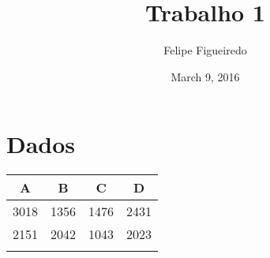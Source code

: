 \documentclass[]{article}
\title{Trabalho 1}
\author{Felipe Figueiredo}
\date{March 9, 2016}
\begin{document}
\maketitle


\section{Dados}\label{dados}

\begin{longtable}[c]{@{}cccc@{}}
\toprule
\begin{minipage}[b]{0.06\columnwidth}\centering\strut
A
\strut\end{minipage} &
\begin{minipage}[b]{0.06\columnwidth}\centering\strut
B
\strut\end{minipage} &
\begin{minipage}[b]{0.06\columnwidth}\centering\strut
C
\strut\end{minipage} &
\begin{minipage}[b]{0.06\columnwidth}\centering\strut
D
\strut\end{minipage}\tabularnewline
\midrule
\endhead
\begin{minipage}[t]{0.06\columnwidth}\centering\strut
3018
\strut\end{minipage} &
\begin{minipage}[t]{0.06\columnwidth}\centering\strut
1356
\strut\end{minipage} &
\begin{minipage}[t]{0.06\columnwidth}\centering\strut
1476
\strut\end{minipage} &
\begin{minipage}[t]{0.06\columnwidth}\centering\strut
2431
\strut\end{minipage}\tabularnewline
\begin{minipage}[t]{0.06\columnwidth}\centering\strut
2151
\strut\end{minipage} &
\begin{minipage}[t]{0.06\columnwidth}\centering\strut
2042
\strut\end{minipage} &
\begin{minipage}[t]{0.06\columnwidth}\centering\strut
1043
\strut\end{minipage} &
\begin{minipage}[t]{0.06\columnwidth}\centering\strut
2023
\strut\end{minipage}\tabularnewline
\begin{minipage}[t]{0.06\columnwidth}\centering\strut

\end{minipage}
\end{longtable}
\end{document}
